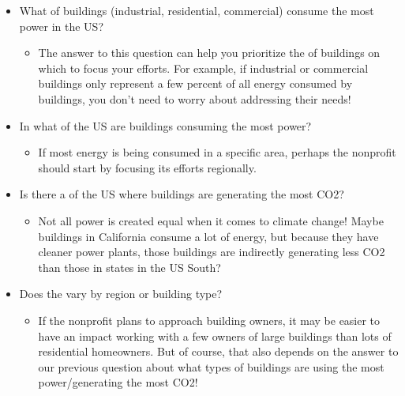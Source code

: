 \documentclass[letterpaper,10pt,english]{jupyterBook}
\begin{document}
\begin{itemize}
\item {} 
\sphinxAtStartPar
What  of buildings (industrial, residential, commercial) consume the most power in the US?
\begin{itemize}
\item {} 
\sphinxAtStartPar
The answer to this question can help you prioritize the  of buildings on which to focus your efforts. For example, if industrial or commercial buildings only represent a few percent of all energy consumed by buildings, you don’t need to worry about addressing their needs!

\end{itemize}

\item {} 
\sphinxAtStartPar
In what  of the US are buildings consuming the most power?
\begin{itemize}
\item {} 
\sphinxAtStartPar
If most energy is being consumed in a specific area, perhaps the non\sphinxhyphen{}profit should start by focusing its efforts regionally.

\end{itemize}

\item {} 
\sphinxAtStartPar
Is there a  of the US where buildings are generating the most CO2?
\begin{itemize}
\item {} 
\sphinxAtStartPar
Not all power is created equal when it comes to climate change! Maybe buildings in California consume a lot of energy, but because they have cleaner power plants, those buildings are indirectly generating less CO2 than those in states in the US South?

\end{itemize}

\item {} 
\sphinxAtStartPar
Does the  vary by region or building type?
\begin{itemize}
\item {} 
\sphinxAtStartPar
If the non\sphinxhyphen{}profit plans to approach building owners, it may be easier to have an impact working with a few owners of large buildings than lots of residential homeowners. But of course, that also depends on the answer to our previous question about what types of buildings are using the most power/generating the most CO2!


\end{itemize}
\end{itemize}
\end{document}

